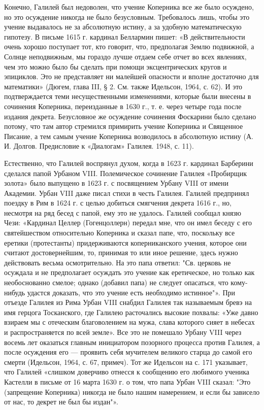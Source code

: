 Конечно, Галилей был недоволен, что учение Коперника все же было осуждено, но
это осуждение никогда не было безусловным. Требовалось лишь, чтобы это учение
выдавалось не за абсолютную истину, а за удобную математическую гипотезу. В
письме 1615 г. кардинал Беллармин пишет: «В действительности очень хорошо
поступает тот, кто говорит, что, предполагая Землю подвижной, а Солнце
неподвижным, мы гораздо лучше отдаем себе отчет во всех явлениях, чем это можно
было бы сделать при помощи эксцентрических кругов и эпициклов. Это не
представляет ни малейшей опасности и вполне достаточно для математики» (Дюгем,
глава III, § 2. См. также Идельсон, 1964, с. 62). И это подтверждается теми
несущественными изменениями, которые были внесены в сочинения Коперника,
переизданные в 1630 г., т. е. через четыре года после издания декрета.
Безусловное же осуждение сочинения Фоскарини было сделано потому, что там автор
стремился примирить учение Коперника и Священное Писание, а тем самым учение
Коперника возводилось в абсолютную истину (А. И. Долгов. Предисловие к
«Диалогам» Галилея. 1948, с. 11).

Естественно, что Галилей воспрянул духом, когда в 1623 г. кардинал Барберини
сделался папой Урбаном VIII. Полемическое сочинение Галилея «Пробирщик золота»
было выпущено в 1623 г. с посвящением Урбану VIII от имени Академии. Урбан VIII
даже писал стихи в честь Галилея. Галилей предпринял поездку в Рим в 1624 г. с
целью добиться смягчения декрета 1616 г., но, несмотря на ряд бесед с папой,
ему это не удалось. Галилей сообщал князю Чези: «Кардинал Целлер (Гогенцоллерн)
передал мне, что он имел беседу с его святейшеством относительно Коперника и
сказал папе, что, поскольку все еретики
(протестанты) придерживаются коперниканского учения, которое они считают
достовернейшим, то, принимая то или иное решение, здесь нужно действовать
весьма осмотрительно. На это папа ответил: "Св. церковь не осуждала и не
предполагает осуждать это учение как еретическое, но только как необоснованно
смелое; однако (добавил папа) не следует опасаться, что кому-нибудь удастся
доказать, что это учение есть необходимо истинное"». При отъезде Галилея из
Рима Урбан VIII снабдил Галилея так называемым бревэ на имя герцога
Тосканского, где Галилею расточались высокие похвалы: «Уже давно взираем мы с
отеческим благоволением на мужа, слава которого сияет в небесах и
распространяется по всей земле». Все это не помешало Урбану VIII через восемь
лет оказаться главным инициатором позорного процесса против Галилея, а после
осуждения его --- проявить себя мучителем великого старца до самой его смерти
(Идельсон, 1964, с. 67, примеч). Тот же Идельсон на с. 171 указывает, что
Галилей «слишком доверчиво отнесся к сообщению его любимого ученика Кастелли в
письме от 16 марта 1630 г. о том, что папа Урбан VIII сказал: "Это (запрещение
Коперника) никогда не было нашим намерением, и если бы зависело от нас, то
декрет не был бы издан"».


